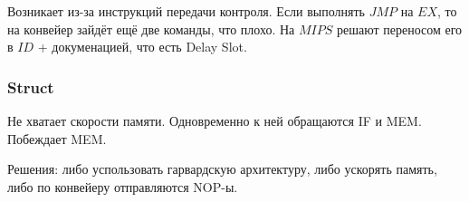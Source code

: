 \documentclass[12pt, a4paper]{article}
\begin{document}
Возникает из-за инструкций передачи контроля.
Если выполнять $JMP$ на $EX$, то на конвейер зайдёт ещё две команды, что плохо.
На $MIPS$ решают переносом его в $ID$ + докуменацией, что есть Delay Slot.


\subsubsection{Struct}

Не хватает скорости памяти. Одновременно к ней обращаются IF и MEM.
Побеждает MEM. 

Решения: либо успользовать гарвардскую архитектуру, либо ускорять память, либо по конвейеру отправляются NOP-ы.
\end{document}
